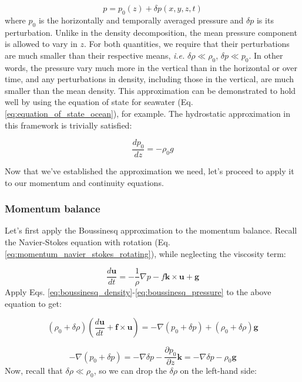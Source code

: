 \documentclass[12pt]{article}
\numberwithin{equation}{section}
\numberwithin{figure}{section}
\numberwithin{table}{section}
\begin{document}
\begin{equation}
  p = p_0(z) + \delta p(x, y, z, t)
  \label{eq:boussinesq_pressure}
\end{equation}
where $p_0$ is the horizontally and temporally averaged pressure and $\delta p$
is its perturbation.
Unlike in the density decomposition, the mean pressure component is allowed to
vary in $z$.
For both quantities, we require that their perturbations are much smaller
than their respective means, \textit{i.e.} $\delta \rho \ll \rho_0$, $\delta p \ll p_0$.
In other words, the pressure vary much more in the vertical than in the
horizontal or over time, and any perturbations in density, including those in
the vertical, are much smaller than the mean density.
This approximation can be demonstrated to hold well by using the equation of
state for seawater (Eq. \ref{eq:equation_of_state_ocean}), for example.
The hydrostatic approximation in this framework is trivially satisfied:

\begin{equation}
  \frac{d p_0}{d z} = - \rho_0 g
  \label{eq:boussinesq_pressure_hydrostatic}
\end{equation}

Now that we've established the approximation we need, let's proceed to apply it
to our momentum and continuity equations.

\subsubsection{Momentum balance}

Let's first apply the Boussinesq approximation to the momentum balance.
Recall the Navier-Stokes equation with rotation
(Eq. \ref{eq:momentum_navier_stokes_rotating}), while neglecting the viscosity
term:

\begin{equation}
  \frac{d \mathbf{u}}{dt} = - \frac{1}{\rho} \nabla p - f \mathbf{k} \times \mathbf{u} + \mathbf{g}
\end{equation}
Apply Eqs. \ref{eq:boussinesq_density}-\ref{eq:boussinesq_pressure} to the
above equation to get:

\begin{equation}
  \left( \rho_0 + \delta \rho \right) \left( \frac{d \mathbf{u}}{dt} + \mathbf{f} \times \mathbf{u} \right) =
  - \nabla \left( p_0 + \delta p \right)
  + \left( \rho_0 + \delta \rho \right) \mathbf{g}
\end{equation}

\begin{equation}
  - \nabla \left( p_0 + \delta p \right) =
  - \nabla \delta p - \frac{\partial p_0}{\partial z} \mathbf{k} = 
  - \nabla \delta p - \rho_0 \mathbf{g}
\end{equation}
Now, recall that $\delta \rho \ll \rho_0$, so we can drop the $\delta \rho$
on the left-hand side:
\end{document}
